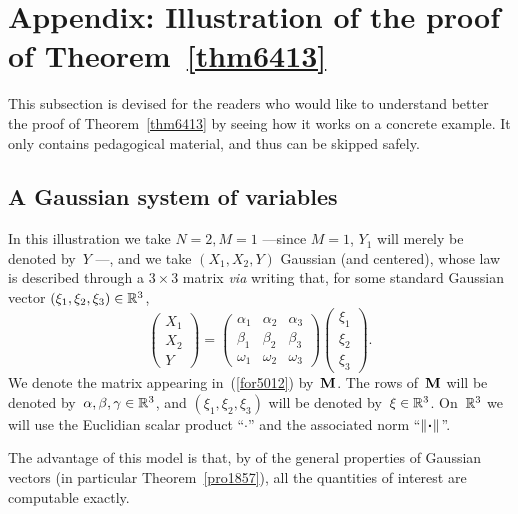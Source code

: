 \section{Appendix: Illustration of the proof of Theorem~\ref{thm6413}}%
\label{parIllustrationOfTheProofs}

\begin{NOTA}
This subsection is devised for the readers who would like to
understand better the proof of Theorem~\ref{thm6413}
by seeing how it works on a concrete example.
It only contains pedagogical material,
and thus can be skipped safely.
\end{NOTA}


\subsection{A Gaussian system of variables}\label{parX1X2Y}

In this illustration we take $N=2, M=1$ —since $M=1$, $Y_1$ will merely be denoted by~$Y$ —,
and we take $(X_1,X_2,Y)$ Gaussian (and centered),
whose law is described through a $3\times3$ matrix
\emph{via} writing that, for some standard Gaussian vector $(\xi_1,\xi_2,\xi_3) \in \mathbb{R}^3$,
\[\label{for5012}
\begin{pmatrix} X_1\\X_2\\Y \end{pmatrix} =
\begin{pmatrix} \alpha_1 & \alpha_2 & \alpha_3 \\
\beta_1 & \beta_2 & \beta_3 \\ \omega_1 & \omega_2 & \omega_3 \end{pmatrix}
\begin{pmatrix} \xi_1\\\xi_2\\\xi_3 \end{pmatrix}.\]
We denote the matrix appearing in~(\ref{for5012}) by~$\mathbf{M}$.
The rows of~$\mathbf{M}$ will be denoted by~$\alpha,\beta,\gamma \in \mathbb{R}^3$,
and $(\xi_1,\xi_2,\xi_3)$ will be denoted by~$\xi\in\mathbb{R}^3$.
On~$\mathbb{R}^3$ we will use the Euclidian scalar product ``$\cdot$'' and the associated norm ``$\|\Bcdot\|$''.

The advantage of this model is that,
by of the general properties of Gaussian vectors
(in particular Theorem~\ref{pro1857}),
all the quantities of interest are computable exactly.

